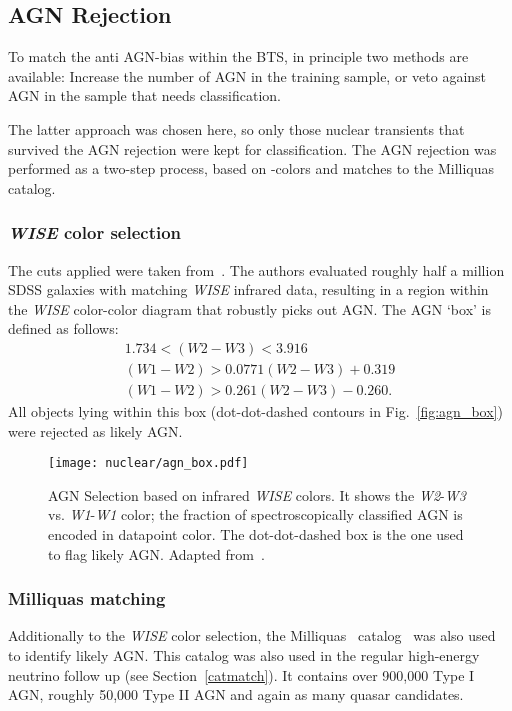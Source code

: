 \subsection{AGN Rejection}\label{agn_rejection}
To match the anti AGN-bias within the BTS, in principle two methods are available: Increase the number of AGN in the training sample, or veto against AGN in the sample that needs classification.

The latter approach was chosen here, so only those nuclear transients that survived the AGN rejection were kept for classification. The AGN rejection was performed as a two-step process, based on -colors and matches to the Milliquas catalog.

\subsubsection{\textit{WISE} color selection}\label{wise_color_cut}
The cuts applied were taken from~\cite{Hviding2022}. The authors evaluated roughly half a million SDSS galaxies with matching \textit{WISE} infrared data, resulting in a region within the \textit{WISE} color-color diagram that robustly picks out AGN. The AGN `box' is defined as follows:
\begin{subequations}
    \begin{eqnarray}
        1.734 < (\textit{W2}-\textit{W3}) < 3.916 \\
        (\textit{W1}-\textit{W2}) > 0.0771 (\textit{W2}-\textit{W3}) + 0.319 \\
        (\textit{W1}-\textit{W2}) > 0.261 (\textit{W2}-\textit{W3}) - 0.260.
    \end{eqnarray}
\end{subequations}
All objects lying within this box (dot-dot-dashed contours in Fig.~\ref{fig:agn_box}) were rejected as likely AGN.

\begin{figure}[htpb]
    \texttt{[image: nuclear/agn\_box.pdf]}
    \caption[Infrared AGN selection]{AGN Selection based on infrared \textit{WISE} colors. It shows the \textit{W2}-\textit{W3} vs. \textit{W1}-\textit{W1} color; the fraction of spectroscopically classified AGN is encoded in datapoint color. The dot-dot-dashed box is the one used to flag likely AGN. Adapted from~\cite{Hviding2022}.}
\end{figure}

\subsubsection{Milliquas matching}\label{milliquas_cut}
Additionally to the \textit{WISE} color selection, the Milliquas~\cite{Milliquas} catalog~ was also used to identify likely AGN. This catalog was also used in the regular high-energy neutrino follow up (see Section~\ref{catmatch}). It contains over 900,000 Type I AGN, roughly 50,000 Type II AGN and again as many quasar candidates.

